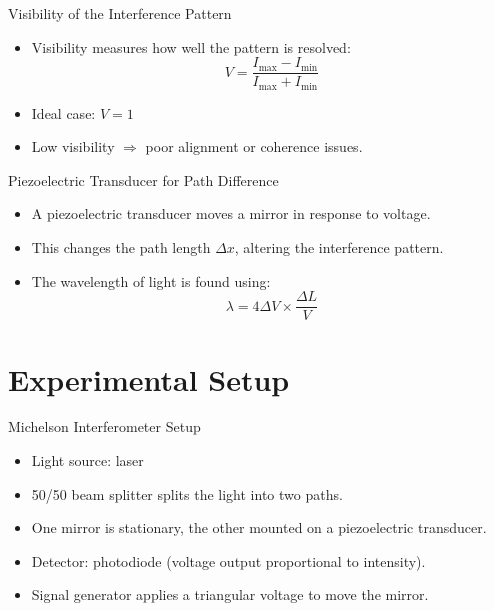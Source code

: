\documentclass[aspectratio = 169]{beamer}
\begin{document}
\begin{frame}{Visibility of the Interference Pattern}
    \begin{itemize}
        \item Visibility measures how well the pattern is resolved:
        \[
        V = \frac{I_{\text{max}} - I_{\text{min}}}{I_{\text{max}} + I_{\text{min}}}
        \]
        \item Ideal case: $V = 1$
        \item Low visibility $\Rightarrow$ poor alignment or coherence issues.
    \end{itemize}
\end{frame}

\begin{frame}{Piezoelectric Transducer for Path Difference}
    \begin{itemize}
        \item A piezoelectric transducer moves a mirror in response to voltage.
        \item This changes the path length $\Delta x$, altering the interference pattern.
        \item The wavelength of light is found using:
        \[
        \lambda = 4 \Delta V \times \frac{\Delta L}{V}
        \]
    \end{itemize}
\end{frame}

\section{Experimental Setup}
\begin{frame}{Michelson Interferometer Setup}
    \begin{itemize}
        \item Light source: laser
        \item 50/50 beam splitter splits the light into two paths.
        \item One mirror is stationary, the other mounted on a piezoelectric transducer.
        \item Detector: photodiode (voltage output proportional to intensity).
        \item Signal generator applies a triangular voltage to move the mirror.
    \end{itemize}
\end{frame}
\end{document}
